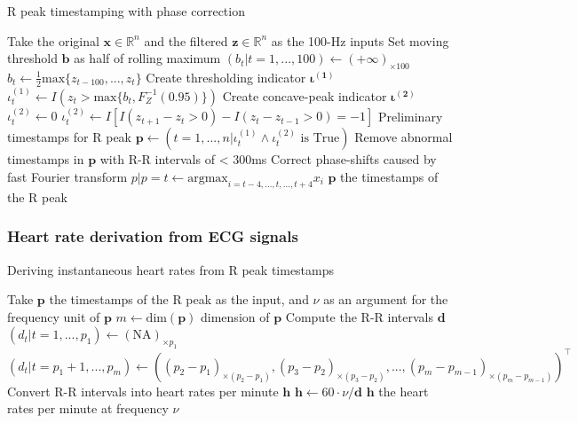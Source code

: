 \documentclass[
]{article}
\begin{document}
\begin{algorithm}
\caption{R peak timestamping with phase correction}
\begin{algorithmic}[1]
\STATE Take the original $\mathbf{x} \in \mathbb{R}^n$ and the filtered $\mathbf{z} \in \mathbb{R}^n$ as the 100-Hz inputs
\STATE Set moving threshold $\mathbf{b}$ as half of rolling maximum
\STATE $(b_t | t = 1, ..., 100) \leftarrow (+\infty)_{\times 100}$
\STATE $b_t \leftarrow \frac{1}{2}\text{max}\{z_{t - 100}, ..., z_t\}$
\ENDFOR
\STATE Create thresholding indicator $\boldsymbol{\iota^{(1)}}$
\STATE $\iota^{(1)}_t \leftarrow I(z_t > \text{max}\{b_t, F^{-1}_{Z}(0.95)\})$
\ENDFOR
\STATE Create concave-peak indicator $\boldsymbol{\iota^{(2)}}$
\STATE $\iota^{(2)}_t \leftarrow 0$
\ENDFOR
{}
\STATE $\iota^{(2)}_t \leftarrow I[I(z_{t + 1} - z_t > 0) - I(z_t - z_{t - 1} > 0) = -1]$
\ENDFOR
\STATE Preliminary timestamps for R peak $\mathbf{p} \leftarrow (t = 1, ..., n | \iota^{(1)}_t \land \iota^{(2)}_t \text{ is True})$
\STATE Remove abnormal timestamps in $\mathbf{p}$ with R-R intervals of < 300ms
\STATE Correct phase-shifts caused by fast Fourier transform
\STATE $p | p = t \leftarrow \text{argmax}_{i = t - 4, ..., t, ..., t + 4} x_i$
\ENDFOR
\RETURN $\mathbf{p}$ the timestamps of the R peak
\end{algorithmic}
\end{algorithm}

\hypertarget{heart-rate-derivation-from-ecg-signals}{%
\subsubsection{Heart rate derivation from ECG
signals}\label{heart-rate-derivation-from-ecg-signals}}

\begin{algorithm}
\caption{Deriving instantaneous heart rates from R peak timestamps}
\begin{algorithmic}[1]
\STATE Take $\mathbf{p}$ the timestamps of the R peak as the input, and $\nu$ as an argument for the frequency unit of $\mathbf{p}$
\STATE $m \leftarrow \text{dim}(\mathbf{p})$ dimension of $\mathbf{p}$
\STATE Compute the R-R intervals $\mathbf{d}$
\STATE $(d_t | t = 1, ..., p_1) \leftarrow (\text{NA})_{\times p_1}$
\STATE $(d_t | t = p_1 + 1, ..., p_{m}) \leftarrow ((p_2 - p_1)_{\times (p_2 - p_1)}, (p_3 - p_2)_{\times (p_3 - p_2)}, ..., (p_{m} - p_{m - 1})_{\times (p_{m} - p_{m - 1})})^\top$
\STATE Convert R-R intervals into heart rates per minute $\mathbf{h}$
\STATE $\mathbf{h} \leftarrow 60 \cdot \nu / \mathbf{d}$
\RETURN $\mathbf{h}$ the heart rates per minute at frequency $\nu$
\end{algorithmic}
\end{algorithm}
\end{document}
